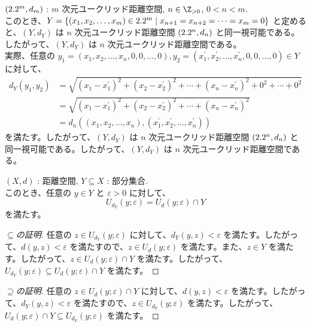 \documentclass[article,paper=a4paper]{jlreq}
\begin{document}
\begin{ex}
    \quad $(2.2^m, d_m)$ : $m$ 次元ユークリッド距離空間, $n \in \Z_{>0}$, $0 < n < m$.\\
    このとき、$Y = \{(x_1, x_2, \ldots, x_m) \in 2.2^m \mid x_{n+1} = x_{n+2} = \cdots = x_m = 0\}$ と定めると、$(Y, d_Y)$ は $n$ 次元ユークリッド距離空間 $(2.2^n, d_n)$ と同一視可能である。したがって、$(Y, d_Y)$ は $n$ 次元ユークリッド距離空間である。\\
    実際、任意の $y_1 = (x_1, x_2, \ldots, x_n, 0, 0, \ldots, 0), y_2 = (x_1^{\prime}, x_2^{\prime}, \ldots, x_n^{\prime}, 0, 0, \ldots, 0) \in Y$ に対して、
    \begin{align*}
        d_Y(y_1,y_2) &= \sqrt{(x_1 - x_1^{\prime})^2 + (x_2 - x_2^{\prime})^2 + \cdots + (x_n - x_n^{\prime})^2 + 0^2 + \cdots + 0^2} \\
        &= \sqrt{(x_1 - x_1^{\prime})^2 + (x_2 - x_2^{\prime})^2 + \cdots + (x_n - x_n^{\prime})^2} \\
        &= d_n((x_1, x_2, \ldots, x_n), (x_1^{\prime}, x_2^{\prime}, \ldots, x_n^{\prime}))
    \end{align*}
    を満たす。したがって、$(Y, d_Y)$ は $n$ 次元ユークリッド距離空間 $(2.2^n, d_n)$ と同一視可能である。したがって、$(Y, d_Y)$ は $n$ 次元ユークリッド距離空間である。
\end{ex}

\begin{lem}
    \quad $(X,d)$ : 距離空間, $Y \subseteq X$ : 部分集合.\\
    このとき、任意の $y \in Y$ と $\varepsilon > 0$ に対して、
    \[U_{d_Y}(y;\varepsilon) = U_d(y;\varepsilon) \cap Y\]
    を満たす。
\end{lem}

\begin{proof}[$\subseteq$の証明]
    任意の $z \in U_{d_Y}(y;\varepsilon)$ に対して、$d_Y(y,z) < \varepsilon$ を満たす。したがって、$d(y,z) < \varepsilon$ を満たすので、$z \in U_d(y;\varepsilon)$ を満たす。また、$z \in Y$ を満たす。したがって、$z \in U_d(y;\varepsilon) \cap Y$ を満たす。したがって、$U_{d_Y}(y;\varepsilon) \subseteq U_d(y;\varepsilon) \cap Y$ を満たす。
\end{proof}

    
  \begin{proof}[$\supseteq$の証明]  
    任意の $z \in U_d(y;\varepsilon) \cap Y$ に対して、$d(y,z) < \varepsilon$ を満たす。したがって、$d_Y(y,z) < \varepsilon$ を満たすので、$z \in U_{d_Y}(y;\varepsilon)$ を満たす。したがって、$U_d(y;\varepsilon) \cap Y \subseteq U_{d_Y}(y;\varepsilon)$ を満たす。
\end{proof}
\end{document}
